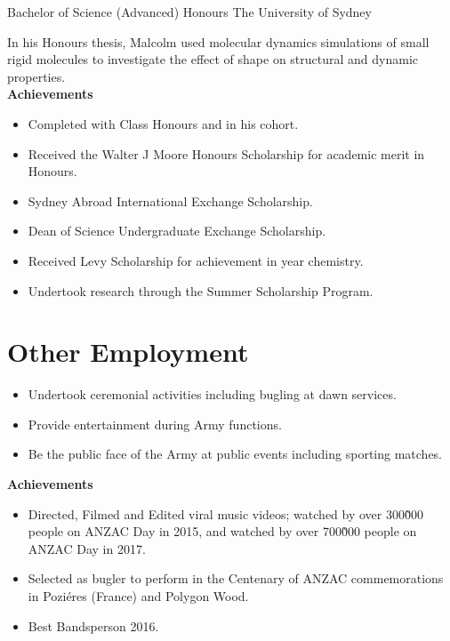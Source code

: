 {Bachelor of Science (Advanced) Honours}
{The University of Sydney}{}{}
{%
  In his Honours thesis,
  Malcolm used molecular dynamics simulations of small rigid molecules
  to investigate the effect of shape on structural and dynamic properties.\\
\textbf{Achievements}
\begin{itemize}
  \item Completed with  Class Honours and  in his cohort.
  \item Received the Walter J Moore Honours Scholarship for academic merit in Honours.
  \item Sydney Abroad International Exchange Scholarship.
  \item Dean of Science Undergraduate Exchange Scholarship.
  \item Received Levy Scholarship for achievement in  year chemistry.
  \item Undertook research through the Summer Scholarship Program.
\end{itemize}
}

\section{Other Employment}

{}{}
{%
\begin{itemize}
  \item Undertook ceremonial activities including bugling at dawn services.
  \item Provide entertainment during Army functions.
  \item Be the public face of the Army at public events including sporting matches.
\end{itemize}
\textbf{Achievements}
\begin{itemize}
  \item Directed, Filmed and Edited viral music videos;
     watched by over 300\~000 people on ANZAC Day in 2015,
    and  watched by over 700\~000 people on ANZAC Day in 2017.
  \item Selected as bugler to perform in the Centenary of ANZAC commemorations in Poziéres (France) and Polygon Wood.
  \item Best Bandsperson 2016.
\end{itemize}
}

